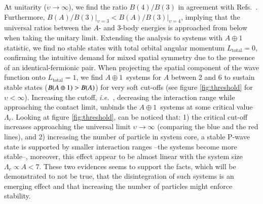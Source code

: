 \documentclass[preprint,12pt]{elsarticle}
\newcommand{\lc}{\ensuremath{\Lambda_c}}
\newcommand{\abb}{\mbox{\ensuremath{A\oplus 1}}}
\newcommand{\ie}{\textit{i.e.}~}
\begin{document}
%
At unitarity ($\upsilon\rightarrow \infty$), we find the ratio $B(4)/B(3)$ in agreement with 
Refs.~\cite{Hammer:2006ct,2009NatPh...5..417V}.
Furthermore, \mbox{$B(A)/B(3)\Big\vert_{\upsilon=3}<B(A)/B(3)\Big\vert_{\upsilon=4}$}, implying that the universal ratios between the $A$- and 3-body energies is approached from below when taking the unitary limit.
%
Extending the analysis to systems with \abb~ statistic, we find no stable states with total orbital angular momentum $L_\text{total}=0$, confirming the intuitive demand for mixed spatial symmetry due to the presence of an identical-fermionic pair.
When projecting the spatial component of the wave function onto \mbox{$L_\text{total}=1$}, we find \abb~systems for $A$ between 2 and 6 to sustain stable states \mbox{($B(\abb)>B(A)$)} for very soft cut-offs (see figure \ref{fig:threshold} for $\upsilon<\infty$).
Increasing the cutoff, \ie, decreasing the interaction range while approaching the contact limit, unbinds the \abb~systems at some critical value $\lc$.
%
Looking at figure \ref{fig:threshold}, can be noticed that: 1) the critical cut-off increases approaching the  universal limit $\upsilon\rightarrow\infty$ (comparing the blue and the red lines), and 2) increasing the number of particle in system core, a stable P-wave state is supported by smaller interaction ranges --the systems become more stable--, moreover, this effect appear to be almost linear with the system size $\lc\propto A<7$.
These two evidences seems to support the facts, which will be demonstrated to not be true, that the disintegration of such systems is an emerging effect and that increasing the number of particles might enforce stability.
\end{document}
